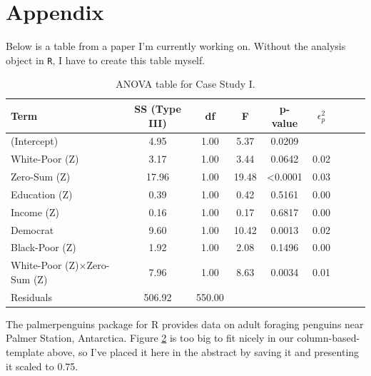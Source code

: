 \documentclass{article}\usepackage[]{graphicx}\usepackage[]{xcolor}
\begin{document}
\begin{multicols}{2}



\begin{tiny}

\end{tiny}
\end{multicols}

\newpage
\onecolumn
\section{Appendix}
Below is a table from a paper I’m currently working on. Without the analysis object in \texttt{R}, I have to create this table myself.
\begin{table}[H]
\begin{center}
\begin{tabular}{l cc cc cc cc}\hline
Term & SS (Type III) & df & F & p-value & $\epsilon_{p}^{2}$ \\\hline
(Intercept) &4.95 &1.00 &5.37 &0.0209\\
White-Poor (Z) &3.17 &1.00 &3.44 &0.0642 & 0.02\\
Zero-Sum (Z) &17.96 &1.00 &19.48 &<0.0001 & 0.03\\
Education (Z) &0.39 &1.00 &0.42 &0.5161 & 0.00\\
Income (Z) &0.16 &1.00 &0.17 &0.6817 & 0.00\\
Democrat &9.60 &1.00 &10.42 &0.0013 & 0.02\\
Black-Poor (Z) &1.92 &1.00 &2.08 &0.1496 & 0.00\\
White-Poor (Z)$\times$Zero-Sum (Z) &7.96 &1.00 &8.63 &0.0034 & 0.01\\
Residuals &506.92 &550.00\\\hline
\end{tabular} \label{full.sleep.tab}
\caption{ANOVA table for Case Study I.}
\end{center}
\end{table}
The palmerpenguins package for R \citep{Horst2020} provides data on adult foraging penguins near Palmer Station, Antarctica. Figure \href{"penguins.pdf"} 2 is too big to fit nicely in our column-based-template above, so I’ve placed it here in the abstract by saving it and presenting it scaled to 0.75.
\end{document}
